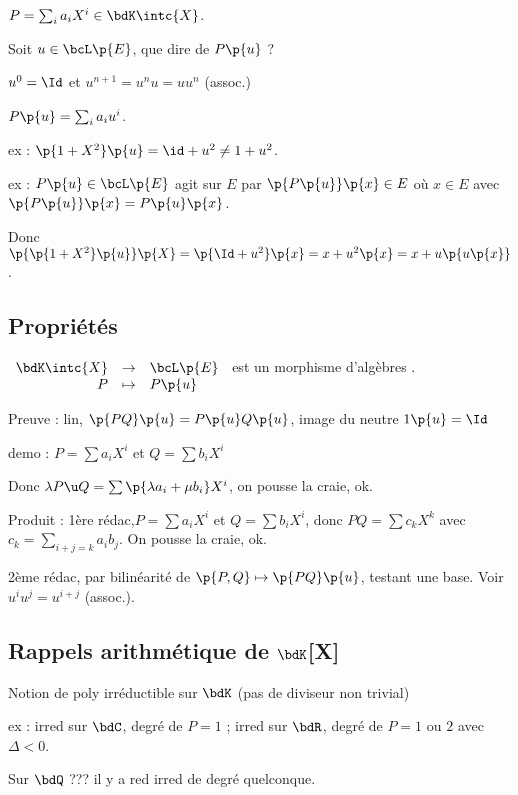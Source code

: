 \documentclass[a4paper,french,bookmarks]{book}
\begin{document}
    $P = \sum_i a_iX^i \in \bdK\intc{X}$.
    
    Soit $u \in \bcL\p{E}$, que dire de $P\p{u}$ ?
    
    $u^0 = \Id$ et $u^{n+1} = u^n u = uu^n$ (assoc.)
    
    $P\p{u} = \sum_i a_iu^i$.
    
    ex : $\p{1 + X^2}\p{u} = \id + u^2 \neq 1 + u^2$.
    
    ex : $P\p{u} \in \bcL\p{E}$ agit sur $E$ par $\p{P\p{u}}\p{x} \in E$ où $x \in E$ avec $\p{P\p{u}}\p{x} = P\p{u}\p{x}$.
    
    Donc $\p{\p{1 + X^2}\p{u}}\p{X} = \p{\Id + u^2}\p{x} = x + u^2\p{x} = x + u\p{u\p{x}}$.
    
    \subsection{Propriétés}
    
    $\begin{array}[t]{rcl}
        \bdK\intc{X} &\to& \bcL\p{E}  \\
        P &\mapsto& P\p{u} 
    \end{array}$ est un morphisme d'algèbres .
    
    Preuve : lin, $\p{PQ}\p{u} = P\p{u}Q\p{u}$, image du neutre $1\p{u} = \Id$
    
    demo : $P = \sum a_iX^i$ et $Q =\sum b_iX^i$
    
    Donc $\lambda P \u Q = \sum \p{\lambda a_i + \mu b_i}X^i$, on pousse la craie, ok.
    
    Produit : 1ère rédac,$P = \sum a_iX^i$ et $Q =\sum b_iX^i$, donc $PQ = \sum c_kX^k$ avec $c_k = \sum_{i+j = k} a_ib_j$. On pousse la craie, ok.
    
    2ème rédac, par bilinéarité de $\p{P, Q} \mapsto \p{PQ}\p{u}$, testant une base. Voir $u^iu^j = u^{i+j}$ (assoc.).
    
    \subsection{Rappels arithmétique de $\bdK$[X]}
    
    Notion de poly irréductible sur $\bdK$ (pas de diviseur non trivial)
    
    ex : irred sur $\bdC$, degré de $P = 1$ ; irred sur $\bdR$, degré de $P = 1$ ou $2$ avec $\Delta < 0$.
    
    Sur $\bdQ$ ??? il y a red irred de degré quelconque.
    
\end{document}
